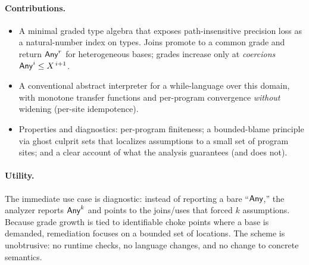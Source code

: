 \paragraph{Contributions.}
\begin{itemize}
  \item A minimal graded type algebra that exposes path-insensitive precision loss as a natural-number index on types. Joins promote to a common grade and return \(\mathsf{Any}^{r}\) for heterogeneous bases; grades increase only at \emph{coercions} \(\mathsf{Any}^{i}\le X^{\,i+1}\).
  \item A conventional abstract interpreter for a while-language over this domain, with monotone transfer functions and per-program convergence \emph{without} widening (per-site idempotence).
  \item Properties and diagnostics: per-program finiteness; a bounded-blame principle via ghost culprit sets that localizes assumptions to a small set of program sites; and a clear account of what the analysis guarantees (and does not).
\end{itemize}

\paragraph{Utility.}
The immediate use case is diagnostic: instead of reporting a bare ``\(\mathsf{Any}\),'' the analyzer reports \(\mathsf{Any}^{k}\) and points to the joins/uses that forced \(k\) assumptions.
Because grade growth is tied to identifiable choke points where a base is demanded, remediation focuses on a bounded set of locations.
The scheme is unobtrusive: no runtime checks, no language changes, and no change to concrete semantics.
